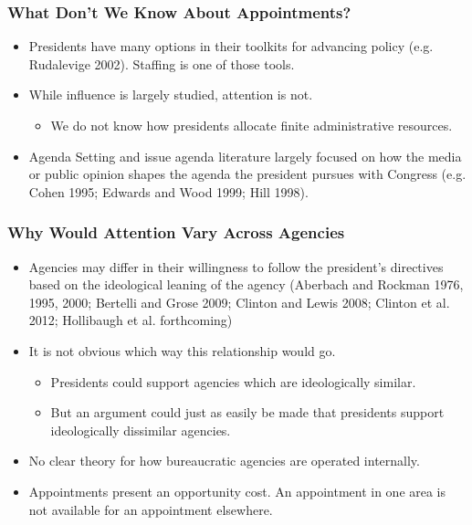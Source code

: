 \documentclass{beamer}
\begin{document}
\begin{frame}
\frametitle{What Don't We Know About Appointments?}

\begin{itemize}\addtolength{\itemsep}{1.25\baselineskip}
\item Presidents have many options in their toolkits for advancing policy (e.g. Rudalevige 2002). Staffing is one of those tools.
\item While influence is largely studied, attention is not.
\begin{itemize}
\item We do not know how presidents allocate finite administrative resources.
\end{itemize}
\item Agenda Setting and issue agenda literature largely focused on how the
media or public opinion shapes the agenda the president pursues with Congress (e.g. Cohen
1995; Edwards and Wood 1999; Hill 1998).

\end{itemize}
\end{frame}

\begin{frame}

\frametitle{Why Would Attention Vary Across Agencies}
\begin{itemize}\addtolength{\itemsep}{0.5\baselineskip}
\item Agencies may differ in their willingness to follow the president's directives based on the ideological leaning of the agency (Aberbach and Rockman 1976, 1995, 2000; Bertelli and Grose 2009; Clinton and Lewis 2008; Clinton et al. 2012; Hollibaugh et al. forthcoming)
\item It is not obvious which way this relationship would go.
\begin{itemize}
\item Presidents could support agencies which are ideologically similar.
\item But an argument could just as easily be made that presidents support ideologically dissimilar agencies. 
\end{itemize}
\item No clear theory for how bureaucratic agencies are operated internally.
\item Appointments present an opportunity cost. An appointment in one area is not available for an appointment elsewhere. 
\end{itemize}
\end{frame}
\end{document}
